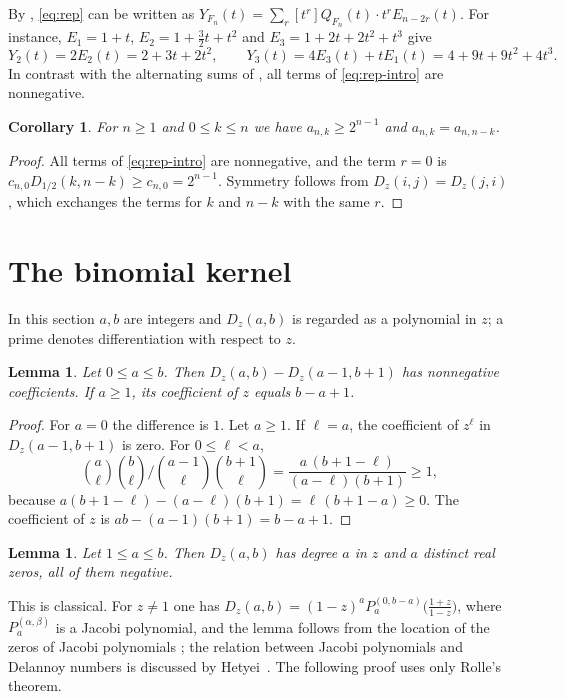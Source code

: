 \documentclass{amsart}
\newtheorem{lemma}[theorem]{Lemma}
\newtheorem{corollary}[theorem]{Corollary}
\theoremstyle{definition}
\theoremstyle{remark}
\numberwithin{equation}{section}
\numberwithin{table}{section}
\newcommand{\Dz}{D_z}
\newcommand{\Dh}{D_{1/2}}
\newcommand{\coef}[1]{[#1]}
\begin{document}
By \cite[Theorem~1.1]{GLL}, \eqref{eq:rep} can be written as $Y_{F_n}(t)=\sum_{r}\coef{t^r}Q_{F_n}(t)\cdot t^{r}E_{n-2r}(t)$. For instance, $E_1=1+t$, $E_2=1+\frac32t+t^2$ and $E_3=1+2t+2t^2+t^3$ give
\[
Y_2(t)=2E_2(t)=2+3t+2t^2,\qquad Y_3(t)=4E_3(t)+tE_1(t)=4+9t+9t^2+4t^3.
\]
In contrast with the alternating sums of \cite[Theorem~1.3]{GLL}, all terms of \eqref{eq:rep-intro} are nonnegative.

\begin{corollary}\label{cor:positive}
For $n\ge 1$ and $0\le k\le n$ we have $a_{n,k}\ge 2^{n-1}$ and $a_{n,k}=a_{n,n-k}$.
\end{corollary}

\begin{proof}
All terms of \eqref{eq:rep-intro} are nonnegative, and the term $r=0$ is $c_{n,0}\Dh(k,n-k)\ge c_{n,0}=2^{n-1}$. Symmetry follows from $\Dz(i,j)=\Dz(j,i)$, which exchanges the terms for $k$ and $n-k$ with the same $r$.
\end{proof}

\section{The binomial kernel}\label{sec:kernel}

In this section $a,b$ are integers and $\Dz(a,b)$ is regarded as a polynomial in $z$; a prime denotes differentiation with respect to $z$.

\begin{lemma}\label{lem:monotone}
Let $0\le a\le b$. Then $\Dz(a,b)-\Dz(a-1,b+1)$ has nonnegative coefficients. If $a\ge 1$, its coefficient of $z$ equals $b-a+1$.
\end{lemma}

\begin{proof}
For $a=0$ the difference is $1$. Let $a\ge 1$. If $\ell=a$, the coefficient of $z^\ell$ in $\Dz(a-1,b+1)$ is zero. For $0\le \ell<a$,
\[
\binom{a}{\ell}\binom{b}{\ell}\Big/\binom{a-1}{\ell}\binom{b+1}{\ell}=\frac{a\,(b+1-\ell)}{(a-\ell)(b+1)}\ge 1,
\]
because $a(b+1-\ell)-(a-\ell)(b+1)=\ell\,(b+1-a)\ge 0$. The coefficient of $z$ is $ab-(a-1)(b+1)=b-a+1$.
\end{proof}

\begin{lemma}\label{lem:zeros}
Let $1\le a\le b$. Then $\Dz(a,b)$ has degree $a$ in $z$ and $a$ distinct real zeros, all of them negative.
\end{lemma}

This is classical. For $z\neq 1$ one has $\Dz(a,b)=(1-z)^aP_a^{(0,b-a)}\bigl(\frac{1+z}{1-z}\bigr)$, where $P^{(\alpha,\beta)}_a$ is a Jacobi polynomial, and the lemma follows from the location of the zeros of Jacobi polynomials \cite[Section~3.3]{Sz}; the relation between Jacobi polynomials and Delannoy numbers is discussed by Hetyei~\cite{He}. The following proof uses only Rolle's theorem.
\end{document}
